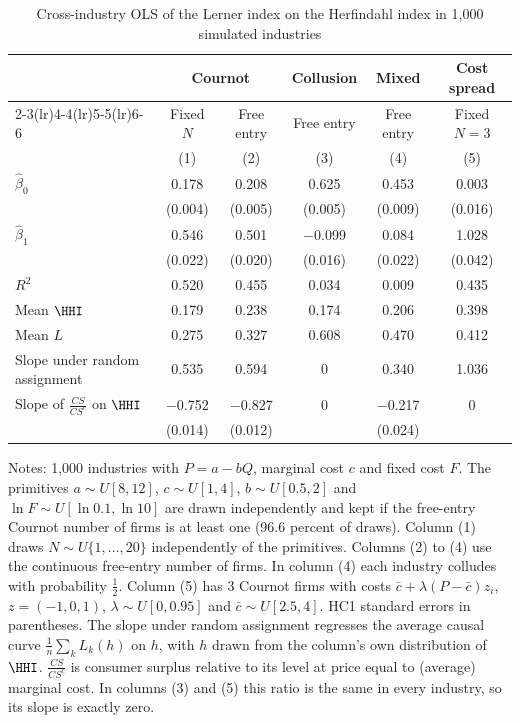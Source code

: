 \begin{table}[htbp]
\centering\small
\caption{Cross-industry OLS of the Lerner index on the Herfindahl index in 1,000 simulated industries}
\label{tab:01-montecarlo}
\begin{threeparttable}
\begin{tabular}{lccccc}
\toprule
 & \multicolumn{2}{c}{Cournot} & Collusion & Mixed & Cost spread \\
\cmidrule(lr){2-3}\cmidrule(lr){4-4}\cmidrule(lr){5-5}\cmidrule(lr){6-6}
 & Fixed $N$ & Free entry & Free entry & Free entry & Fixed $N = 3$ \\
 & (1) & (2) & (3) & (4) & (5) \\
\midrule
$\hat\beta_0$ & 0.178 & 0.208 & 0.625 & 0.453 & 0.003 \\
 & (0.004) & (0.005) & (0.005) & (0.009) & (0.016) \\
$\hat\beta_1$ & 0.546 & 0.501 & $-$0.099 & 0.084 & 1.028 \\
 & (0.022) & (0.020) & (0.016) & (0.022) & (0.042) \\
$R^2$ & 0.520 & 0.455 & 0.034 & 0.009 & 0.435 \\
Mean $\HHI$ & 0.179 & 0.238 & 0.174 & 0.206 & 0.398 \\
Mean $L$ & 0.275 & 0.327 & 0.608 & 0.470 & 0.412 \\
\midrule
Slope under random assignment & 0.535 & 0.594 & 0 & 0.340 & 1.036 \\
Slope of $\frac{CS}{CS^c}$ on $\HHI$ & $-$0.752 & $-$0.827 & 0 & $-$0.217 & 0 \\
 & (0.014) & (0.012) &  & (0.024) &  \\
\bottomrule
\end{tabular}
\begin{tablenotes}\footnotesize
\item Notes: 1,000 industries with $P = a - bQ$, marginal cost $c$ and fixed cost $F$. The primitives
$a \sim U[8, 12]$, $c \sim U[1, 4]$, $b \sim U[0.5, 2]$ and $\ln F \sim U[\ln 0.1, \ln 10]$ are drawn
independently and kept if the free-entry Cournot number of firms is at least one (96.6 percent of
draws). Column (1) draws $N \sim U\{1, \dots, 20\}$ independently of the primitives. Columns (2) to (4)
use the continuous free-entry number of firms. In column (4) each industry colludes with probability
$\frac{1}{2}$. Column (5) has 3 Cournot firms with costs $\bar c + \lambda (P - \bar c) z_i$,
$z = (-1, 0, 1)$, $\lambda \sim U[0, 0.95]$ and $\bar c \sim U[2.5, 4]$. HC1 standard errors in
parentheses. The slope under random assignment regresses the average causal curve
$\frac{1}{n}\sum_k L_k(h)$ on $h$, with $h$ drawn from the column's own distribution of $\HHI$.
$\frac{CS}{CS^c}$ is consumer surplus relative to its level at price equal to (average) marginal cost.
In columns (3) and (5) this ratio is the same in every industry, so its slope is exactly zero.
\end{tablenotes}
\end{threeparttable}
\end{table}

